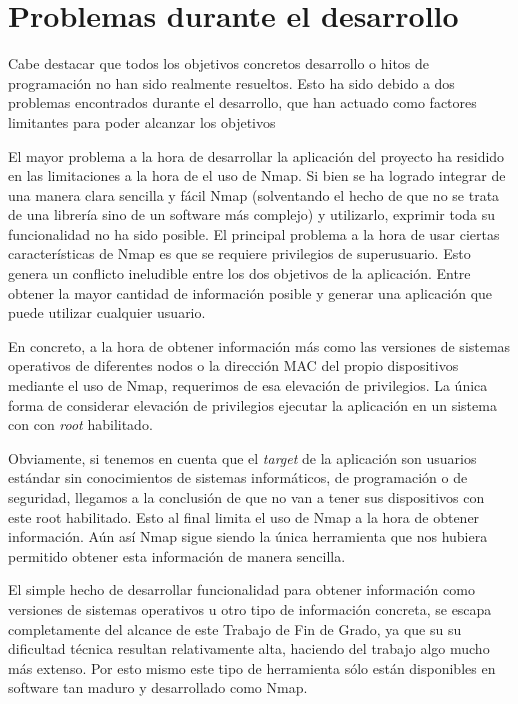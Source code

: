 \section{Problemas durante el desarrollo}

Cabe destacar que todos los objetivos concretos desarrollo o hitos de programación no han sido realmente resueltos. Esto ha sido debido a dos problemas encontrados durante el desarrollo, que han actuado como factores limitantes para poder alcanzar los objetivos 

El mayor problema a la hora de desarrollar la aplicación del proyecto ha residido en las limitaciones a la hora de el uso de Nmap. Si bien se ha logrado integrar de una manera clara sencilla y fácil Nmap (solventando el hecho de que no se trata de una librería sino de un software más complejo) y utilizarlo, exprimir toda su funcionalidad no ha sido posible. 
El principal problema a la hora de usar ciertas características de Nmap es que se requiere privilegios de superusuario. Esto genera un conflicto ineludible entre los dos objetivos de la aplicación. Entre obtener la mayor cantidad de información posible y generar una aplicación que puede utilizar cualquier usuario. 

En concreto, a la hora de obtener información más como las versiones de sistemas operativos de diferentes nodos o la dirección MAC del propio dispositivos mediante el uso de Nmap, requerimos de esa elevación de privilegios. La única forma de considerar elevación de privilegios ejecutar la aplicación en un sistema con con \textit{root} habilitado. 

Obviamente, si tenemos en cuenta que el \textit{target} de la aplicación son usuarios estándar sin conocimientos de sistemas informáticos, de programación o de seguridad, llegamos a la conclusión de que no van a tener sus dispositivos con este root habilitado. Esto al final limita el uso de Nmap a la hora de obtener información. Aún así Nmap sigue siendo la única herramienta que nos hubiera permitido obtener esta información de manera sencilla. 

El simple hecho de desarrollar funcionalidad para obtener información como versiones de sistemas operativos u otro tipo de información concreta, se escapa completamente del alcance de este Trabajo de Fin de Grado, ya que su su dificultad técnica resultan relativamente alta, haciendo del trabajo algo mucho más extenso. Por esto mismo este tipo de herramienta sólo están disponibles en software tan maduro y desarrollado como Nmap.

